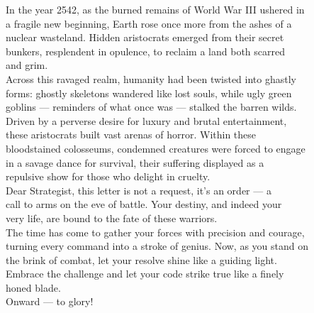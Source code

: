 \documentclass[12pt]{article}
\begin{document}
\begin{flushleft}
In the year 2542, as the burned remains of World War III ushered in \\
a fragile new beginning, Earth rose once more from the ashes of a \\
nuclear wasteland. Hidden aristocrats emerged from their secret \\
bunkers, resplendent in opulence, to reclaim a land both scarred \\
and grim. \\ [1em]

Across this ravaged realm, humanity had been twisted into ghastly \\
forms: ghostly skeletons wandered like lost souls, while ugly green \\
goblins — reminders of what once was — stalked the barren wilds. \\ [1em]

Driven by a perverse desire for luxury and brutal entertainment, \\
these aristocrats built vast arenas of horror. Within these \\
bloodstained colosseums, condemned creatures were forced to engage \\
in a savage dance for survival, their suffering displayed as a \\
repulsive show for those who delight in cruelty. \\ [1em]

Dear Strategist, this letter is not a request, it's an order — a \\
call to arms on the eve of battle. Your destiny, and indeed your \\
very life, are bound to the fate of these warriors. \\ [1em]

The time has come to gather your forces with precision and courage, \\
turning every command into a stroke of genius. Now, as you stand on \\
the brink of combat, let your resolve shine like a guiding light. \\ [1em]

Embrace the challenge and let your code strike true like a finely \\
honed blade. \\ [1em]

Onward — to glory! \\



\end{flushleft}
\end{document}
